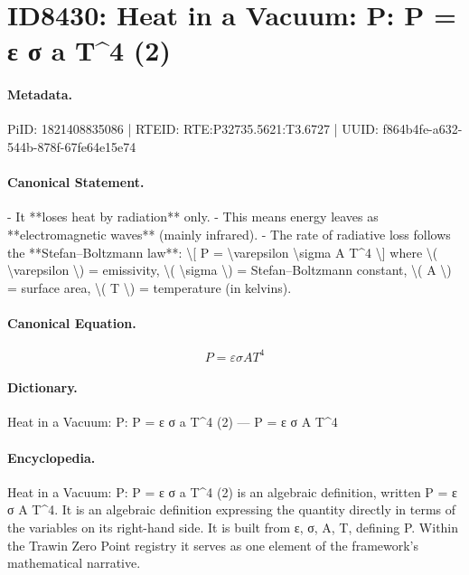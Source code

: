 \section*{ID8430: Heat in a Vacuum: P: P = ε σ a T\textasciicircum{}4 (2)}
\paragraph{Metadata.}
PiID: 1821408835086 | RTEID: RTE:P32735.5621:T3.6727 | UUID: f864b4fe-a632-544b-878f-67fe64e15e74

\paragraph{Canonical Statement.}
- It **loses heat by radiation** only. - This means energy leaves as **electromagnetic waves** (mainly infrared). - The rate of radiative loss follows the **Stefan–Boltzmann law**: \textbackslash{}[ P = \textbackslash{}varepsilon \textbackslash{}sigma A T\textasciicircum{}4 \textbackslash{}] where \textbackslash{}( \textbackslash{}varepsilon \textbackslash{}) = emissivity, \textbackslash{}( \textbackslash{}sigma \textbackslash{}) = Stefan–Boltzmann constant, \textbackslash{}( A \textbackslash{}) = surface area, \textbackslash{}( T \textbackslash{}) = temperature (in kelvins).

\paragraph{Canonical Equation.}
\[
P = \varepsilon \sigma A T^4
\]

\paragraph{Dictionary.}
Heat in a Vacuum: P: P = ε σ a T\textasciicircum{}4 (2) — P = ε σ A T\textasciicircum{}4

\paragraph{Encyclopedia.}
Heat in a Vacuum: P: P = ε σ a T\textasciicircum{}4 (2) is an algebraic definition, written P = ε σ A T\textasciicircum{}4. It is an algebraic definition expressing the quantity directly in terms of the variables on its right-hand side. It is built from ε, σ, A, T, defining P. Within the Trawin Zero Point registry it serves as one element of the framework's mathematical narrative.
